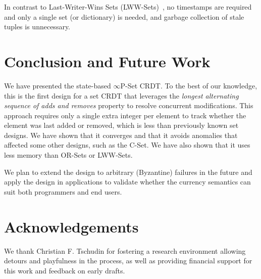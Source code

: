\documentclass[11pt, oneside]{article}   	%
\begin{document}
In contrast to Last-Writer-Wins Sets (LWW-Sets)~\cite{shapiro:inria-00555588}, no timestamps are required and only a single set (or dictionary) is needed, and garbage collection of stale tuples is unnecessary.

%
%
%

%

\section{Conclusion and Future Work}
\label{sec:conclusion}

We have presented the state-based $\infty$P-Set CRDT. To the best of our knowledge, this is the first design for a set CRDT that leverages the \textit{longest alternating sequence of adds and removes} property to resolve concurrent modifications. This approach requires only a single extra integer per element to track whether the element was last added or removed, which is less than previously known set designs. We have shown that it converges and that it avoids anomalies that affected some other designs, such as the C-Set. We have also shown that it uses less memory than OR-Sets or LWW-Sets.

We plan to extend the design to arbitrary (Byzantine) failures in the future and apply the design in applications to validate whether the currency semantics can suit both programmers and end users.

\section{Acknowledgements}
\label{sec:acknowledgements}

We thank Christian F. Tschudin for fostering a research environment allowing detours and playfulness in the process, as well as providing financial support for this work and feedback on early drafts. 
\end{document}
